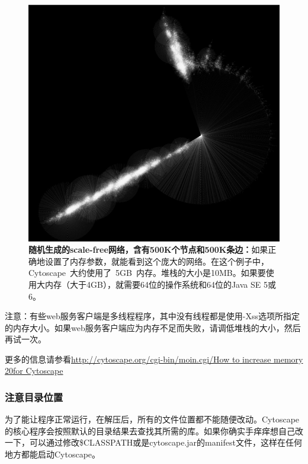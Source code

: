 		\begin{figure}[!h]
		\centering
		\includegraphics[width=\textwidth]{images/one_million_network.png}
		\caption{\textbf{随机生成的scale-free网络，含有500K个节点和500K条边：}如果正确地设置了内存参数，就能看到这个庞大的网络。在这个例子中，Cytoscape~大约使用了~5GB~内存。堆栈的大小是10MB。如果要使用大内存（大于4GB），就需要64位的操作系统和64位的Java SE 5或6。}
		\end{figure}

		注意：有些web服务客户端是多线程程序，其中没有线程都是使用-Xss选项所指定的内存大小。如果web服务客户端应为内存不足而失败，请调低堆栈的大小，然后再试一次。

		更多的信息请参看\href{How to increase memory for Cytoscape}{http://cytoscape.org/cgi-bin/moin.cgi/How to increase memory 20for Cytoscape}

		\subsubsection{注意目录位置}
		为了能让程序正常运行，在解压后，所有的文件位置都不能随便改动。Cytoscape的核心程序会按照默认的目录结果去查找其所需的库。如果你确实手痒痒想自己改一下，可以通过修改\$CLASSPATH或是cytoscape.jar的manifest文件，这样在任何地方都能启动Cytoscape。
